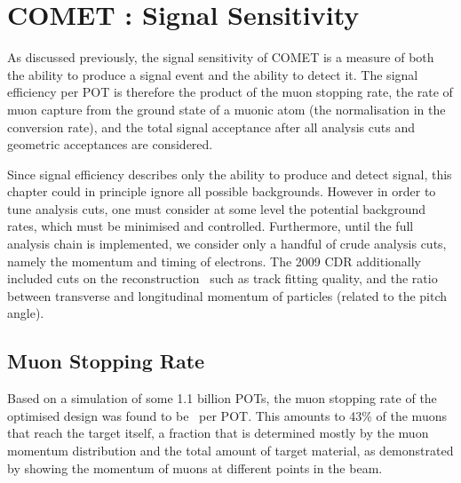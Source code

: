 
\chapter{COMET \phaseII: Signal Sensitivity}
As discussed previously, the signal sensitivity of COMET is a measure of both the ability to produce a signal event
and the ability to detect it.
The signal efficiency per \ac{POT} is therefore the product of the muon stopping rate, the rate of muon capture from the ground state of a muonic atom (the normalisation in the conversion rate), and the total signal acceptance after all analysis cuts and geometric acceptances are considered.

Since signal efficiency describes only the ability to produce and detect signal, this chapter could in principle ignore all possible backgrounds.
However in order to tune analysis cuts, one must consider at some level the potential background rates, which must be minimised and controlled.
Furthermore, until the full analysis chain is implemented, we consider only a handful of crude analysis cuts, namely the momentum and timing of electrons.
The 2009 \ac{CDR} additionally included cuts on the reconstruction~\cite{CDRphase2} such as track fitting quality, and the ratio between transverse and longitudinal momentum of particles (related to the pitch angle).

\FigSensMuMomentum
\section{Muon Stopping Rate}
Based on a simulation of some 1.1 billion \acp{POT}, the muon stopping rate of the optimised design was found to be ~per \ac{POT}.
This amounts to 43\% of the muons that reach the target itself, a fraction that is determined mostly by the muon momentum distribution and the total amount of target material, as demonstrated by 
showing the momentum of muons at different points in the beam.

